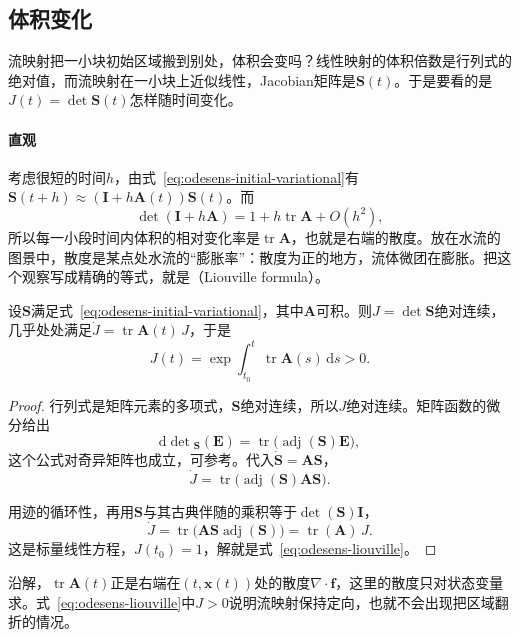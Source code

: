 \subsection{体积变化}
\label{sec:odesens-volume}

流映射把一小块初始区域搬到别处，体积会变吗？线性映射的体积倍数是行列式的绝对值，而流映射在一小块上近似线性，Jacobian矩阵是$\bm{S}(t)$。于是要看的是$J(t)=\det\bm{S}(t)$怎样随时间变化。

\paragraph{直观}
考虑很短的时间$h$，由式~\eqref{eq:odesens-initial-variational}有$\bm{S}(t+h)\approx(\bm{I}+h\bm{A}(t))\bm{S}(t)$。而
\[
 \det(\bm{I}+h\bm{A})=1+h\operatorname{tr}\bm{A}+O(h^2),
\]
所以每一小段时间内体积的相对变化率是$\operatorname{tr}\bm{A}$，也就是右端的散度。放在水流的图景中，散度是某点处水流的“膨胀率”：散度为正的地方，流体微团在膨胀。把这个观察写成精确的等式，就是（Liouville formula）。

\begin{lemma}[Liouville公式]
\label{lem:odesens-liouville}
设$\bm{S}$满足式~\eqref{eq:odesens-initial-variational}，其中$\bm{A}$可积。则$J=\det\bm{S}$绝对连续，几乎处处满足$\dot{J}=\operatorname{tr}\bm{A}(t)\,J$，于是
\begin{equation}
 J(t)=\exp\int_{t_0}^{t}\operatorname{tr}\bm{A}(s)\,\mathrm{d}s>0.
 \label{eq:odesens-liouville}
\end{equation}
\end{lemma}

\begin{proof}
行列式是矩阵元素的多项式，$\bm{S}$绝对连续，所以$J$绝对连续。矩阵函数的微分给出
\[
 \mathrm{d}\det{}_{\bm{S}}(\bm{E})=\operatorname{tr}\bigl(\operatorname{adj}(\bm{S})\bm{E}\bigr),
\]
这个公式对奇异矩阵也成立，可参考。代入$\dot{\bm{S}}=\bm{A}\bm{S}$，
\[
 \dot{J}=\operatorname{tr}\bigl(\operatorname{adj}(\bm{S})\bm{A}\bm{S}\bigr).
\]

用迹的循环性，再用$\bm{S}$与其古典伴随的乘积等于$\det(\bm{S})\bm{I}$，
\[
 \dot{J}=\operatorname{tr}\bigl(\bm{A}\bm{S}\operatorname{adj}(\bm{S})\bigr)=\operatorname{tr}(\bm{A})\,J.
\]
这是标量线性方程，$J(t_0)=1$，解就是式~\eqref{eq:odesens-liouville}。
\end{proof}

沿解，$\operatorname{tr}\bm{A}(t)$正是右端在$(t,\bm{x}(t))$处的散度$\nabla\cdot\bm{f}$，这里的散度只对状态变量求。式~\eqref{eq:odesens-liouville}中$J>0$说明流映射保持定向，也就不会出现把区域翻折的情况。

